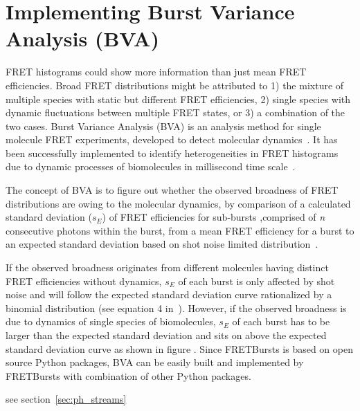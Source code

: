 \section{Implementing Burst Variance Analysis (BVA)}

FRET histograms could show more information than just mean FRET efficiencies. Broad FRET distributions might be attributed to 1) the mixture of multiple species with static but different FRET efficiencies, 2) single species with dynamic fluctuations between multiple FRET states, or 3) a combination of the two cases. Burst Variance Analysis (BVA) is an analysis method for single molecule FRET experiments, developed to detect molecular dynamics~\cite{Torella_2011}. It has been successfully implemented to identify heterogeneities in FRET histograms due to dynamic processes of biomolecules in millisecond time scale~\cite{Torella_2011, Robb_2013}.

The concept of BVA is to figure out whether the observed broadness of FRET distributions are owing to the molecular dynamics, by comparison of a calculated standard deviation ($s_E$) of FRET efficiencies for sub-bursts ,comprised of \textit{n} consecutive photons within the burst, from a mean FRET efficiency for a burst to an expected standard deviation based on shot noise limited distribution~\cite{Torella_2011}. 

If the observed broadness originates from different molecules having distinct FRET efficiencies without dynamics, $s_E$ of each burst is only affected by shot noise and will follow the expected standard deviation curve rationalized by a binomial distribution (see equation 4 in~\cite{Torella_2011}). However, if the observed broadness is due to dynamics of single species of biomolecules, $s_E$ of each burst has to be larger than the expected standard deviation and sits on above the expected standard deviation curve as shown in figure .
Since FRETBursts is based on open source Python packages, BVA can be easily built and implemented by FRETBursts with combination of other Python packages.  



see section~\ref{sec:ph_streams}